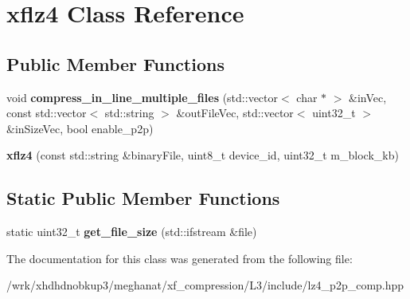 \hypertarget{classxflz4}{\section{xflz4 Class Reference}
\label{classxflz4}
}
\subsection*{Public Member Functions}
\begin{DoxyCompactItemize}
\item 
\hypertarget{classxflz4_a9e27dafab06458253ea566cc183e5737}{void {\bfseries compress\-\_\-in\-\_\-line\-\_\-multiple\-\_\-files} (std\-::vector$<$ char $\ast$ $>$ \&in\-Vec, const std\-::vector$<$ std\-::string $>$ \&out\-File\-Vec, std\-::vector$<$ uint32\-\_\-t $>$ \&in\-Size\-Vec, bool enable\-\_\-p2p)}\label{classxflz4_a9e27dafab06458253ea566cc183e5737}

\item 
\hypertarget{classxflz4_a3e9f8190e723a3aa1f1316177f338370}{{\bfseries xflz4} (const std\-::string \&binary\-File, uint8\-\_\-t device\-\_\-id, uint32\-\_\-t m\-\_\-block\-\_\-kb)}\label{classxflz4_a3e9f8190e723a3aa1f1316177f338370}

\end{DoxyCompactItemize}
\subsection*{Static Public Member Functions}
\begin{DoxyCompactItemize}
\item 
\hypertarget{classxflz4_a8465dc5a5784b38586c66f78c3791d90}{static uint32\-\_\-t {\bfseries get\-\_\-file\-\_\-size} (std\-::ifstream \&file)}\label{classxflz4_a8465dc5a5784b38586c66f78c3791d90}

\end{DoxyCompactItemize}


The documentation for this class was generated from the following file\-:\begin{DoxyCompactItemize}
\item 
/wrk/xhdhdnobkup3/meghanat/xf\-\_\-compression/\-L3/include/lz4\-\_\-p2p\-\_\-comp.\-hpp\end{DoxyCompactItemize}

